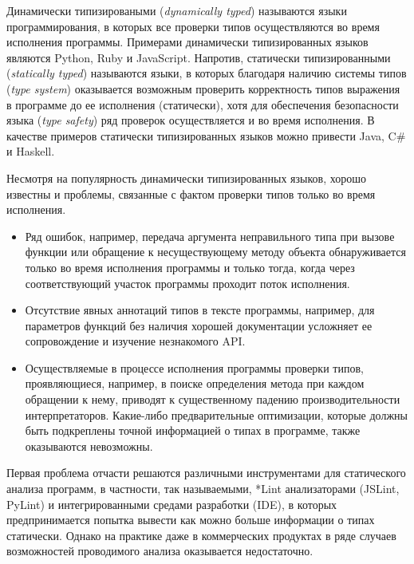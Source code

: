 \intro

Динамически типизироваными (\emph{dynamically typed}) называются языки
программирования, в которых все проверки типов осуществляются во время
исполнения программы. Примерами динамически типизированных языков являются
Python, Ruby и JavaScript.  Напротив, статически типизированными
(\emph{statically typed}) называются языки, в которых благодаря наличию системы
типов (\emph{type system}) оказывается возможным проверить корректность типов
выражения в программе до ее исполнения (статически), хотя для обеспечения
безопасности языка (\emph{type safety}) ряд проверок осуществляется и во время
исполнения.  В качестве примеров статически типизированных языков можно привести
Java, C\# и Haskell.

Несмотря на популярность динамически типизированных языков,
хорошо известны и проблемы, связанные с фактом проверки типов только во время
исполнения.

\begin{itemize}
  \item Ряд ошибок, например, передача аргумента неправильного типа при вызове
      функции или обращение к несуществующему методу объекта обнаруживается
      только во время исполнения программы и только тогда, когда через
      соответствующий участок программы проходит поток исполнения.

  \item Отсутствие явных аннотаций типов в тексте программы, например, для
      параметров функций без наличия хорошей документации усложняет ее
      сопровождение и изучение незнакомого API.

  \item Осуществляемые в процессе исполнения программы проверки типов,
      проявляющиеся, например, в поиске определения метода при каждом обращении
      к нему, приводят к существенному падению производительности
      интерпретаторов. Какие-либо предварительные оптимизации, которые
      должны быть подкреплены точной информацией о типах в программе, также
      оказываются невозможны. 
\end{itemize}

Первая проблема отчасти решаются различными инструментами для статического
анализа программ, в частности, так называемыми, *Lint анализаторами (JSLint,
PyLint) и интегрированными средами разработки (IDE), в которых предпринимается
попытка вывести как можно больше информации о типах статически.  Однако на
практике даже в коммерческих продуктах в ряде случаев возможностей проводимого
анализа оказывается недостаточно.

